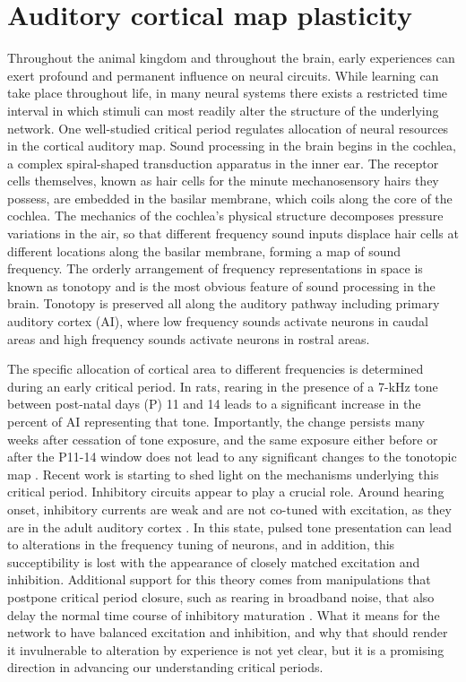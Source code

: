 
\section{Auditory cortical map plasticity}

Throughout the animal kingdom and throughout the brain, early experiences can exert profound and permanent influence on neural circuits. While learning can take place throughout life, in many neural systems there exists a restricted time interval in which stimuli can most readily alter the structure of the underlying network. One well-studied critical period regulates allocation of neural resources in the cortical auditory map. Sound processing in the brain begins in the cochlea, a complex spiral-shaped transduction apparatus in the inner ear. The receptor cells themselves, known as hair cells for the minute mechanosensory hairs they possess, are embedded in the basilar membrane, which coils along the core of the cochlea. The mechanics of the cochlea's physical structure decomposes pressure variations in the air, so that different frequency sound inputs displace hair cells at different locations along the basilar membrane, forming a map of sound frequency. The orderly arrangement of frequency representations in space is known as tonotopy and is the most obvious feature of sound processing in the brain. Tonotopy is preserved all along the auditory pathway including primary auditory cortex (AI), where low frequency sounds activate neurons in caudal areas and high frequency sounds activate neurons in rostral areas.

The specific allocation of cortical area to different frequencies is determined during an early critical period. In rats, rearing in the presence of a 7-kHz tone between post-natal days (P) 11 and 14 leads to a significant increase in the percent of AI representing that tone. Importantly, the change persists many weeks after cessation of tone exposure, and the same exposure either before or after the P11-14 window does not lead to any significant changes to the tonotopic map \cite{DeVillers-Sidani2007}. Recent work is starting to shed light on the mechanisms underlying this critical period. Inhibitory circuits appear to play a crucial role. Around hearing onset, inhibitory currents are weak and are not co-tuned with excitation, as they are in the adult auditory cortex \cite{Dorrn2010}. In this state, pulsed tone presentation can lead to alterations in the frequency tuning of neurons, and in addition, this succeptibility is lost with the appearance of closely matched excitation and inhibition. Additional support for this theory comes from manipulations that postpone critical period closure, such as rearing in broadband noise, that also delay the normal time course of inhibitory maturation \cite{DeVillers-Sidani2008}. What it means for the network to have balanced excitation and inhibition, and why that should render it invulnerable to alteration by experience is not yet clear, but it is a promising direction in advancing our understanding critical periods.

